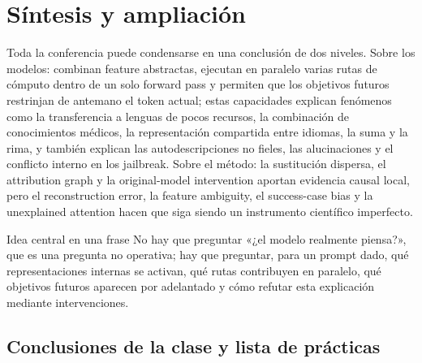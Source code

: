 \section{Síntesis y ampliación}

Toda la conferencia puede condensarse en una conclusión de dos niveles. Sobre los modelos: combinan feature abstractas, ejecutan en paralelo varias rutas de cómputo dentro de un solo forward pass y permiten que los objetivos futuros restrinjan de antemano el token actual; estas capacidades explican fenómenos como la transferencia a lenguas de pocos recursos, la combinación de conocimientos médicos, la representación compartida entre idiomas, la suma y la rima, y también explican las autodescripciones no fieles, las alucinaciones y el conflicto interno en los jailbreak. Sobre el método: la sustitución dispersa, el attribution graph y la original-model intervention aportan evidencia causal local, pero el reconstruction error, la feature ambiguity, el success-case bias y la unexplained attention hacen que siga siendo un instrumento científico imperfecto.

\begin{importantbox}{Idea central en una frase}
No hay que preguntar «¿el modelo realmente piensa?», que es una pregunta no operativa; hay que preguntar, para un prompt dado, qué representaciones internas se activan, qué rutas contribuyen en paralelo, qué objetivos futuros aparecen por adelantado y cómo refutar esta explicación mediante intervenciones.
\end{importantbox}

\subsection{Conclusiones de la clase y lista de prácticas}

